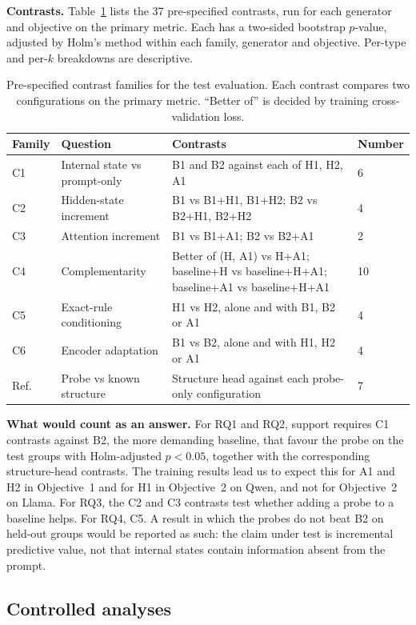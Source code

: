 \documentclass[10pt]{article}
\begin{document}
\textbf{Contrasts.} Table~\ref{tab:contrasts} lists the 37 pre-specified contrasts, run for each generator and
objective on the primary metric. Each has a two-sided bootstrap $p$-value, adjusted by Holm's method
\citep{holm1979} within each family, generator and objective. Per-type and per-$k$ breakdowns are descriptive.

\begin{table}[t]
\centering\small
\caption{Pre-specified contrast families for the test evaluation. Each contrast compares two configurations on the
primary metric. ``Better of'' is decided by training cross-validation loss.}
\label{tab:contrasts}
\begin{tabular}{llp{6.1cm}l}
\toprule
Family & Question & Contrasts & Number \\
\midrule
C1 & Internal state vs prompt-only & B1 and B2 against each of H1, H2, A1 & 6 \\
C2 & Hidden-state increment & B1 vs B1+H1, B1+H2; B2 vs B2+H1, B2+H2 & 4 \\
C3 & Attention increment & B1 vs B1+A1; B2 vs B2+A1 & 2 \\
C4 & Complementarity & Better of (H, A1) vs H+A1; baseline+H vs baseline+H+A1; baseline+A1 vs baseline+H+A1 & 10 \\
C5 & Exact-rule conditioning & H1 vs H2, alone and with B1, B2 or A1 & 4 \\
C6 & Encoder adaptation & B1 vs B2, alone and with H1, H2 or A1 & 4 \\
Ref. & Probe vs known structure & Structure head against each probe-only configuration & 7 \\
\bottomrule
\end{tabular}
\end{table}

\textbf{What would count as an answer.} For RQ1 and RQ2, support requires C1 contrasts against B2, the more demanding baseline, that favour the probe on the test groups
with Holm-adjusted $p<0.05$, together with the corresponding structure-head contrasts. The training results lead us to expect this for A1 and H2 in Objective~1 and for H1 in Objective~2 on Qwen,
and not for Objective~2 on Llama. For RQ3, the C2 and C3 contrasts test whether adding a probe to a baseline helps. For
RQ4, C5. A result in which the probes do not beat B2 on held-out groups would be reported as such: the claim under test
is incremental predictive value, not that internal states contain information absent from the prompt.

\subsection{Controlled analyses}
\end{document}

